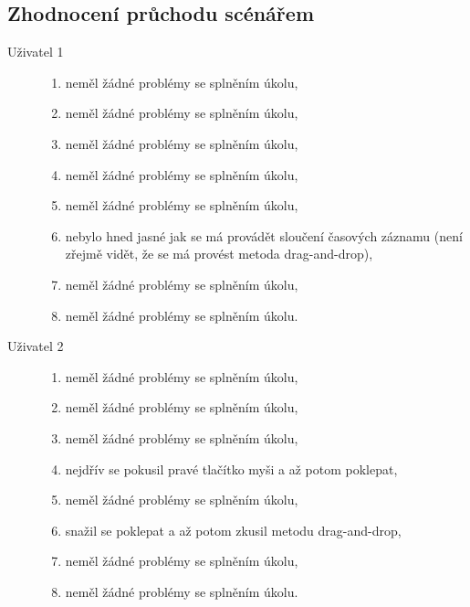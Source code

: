 \documentclass[thesis=B,czech]{FITthesis}[2012/06/26]
\begin{document}
\subsection{Zhodnocení průchodu scénářem}

\begin{description}
		\item[Uživatel 1] \hspace*{\fill} 
		\begin{enumerate}
			\item neměl žádné problémy se splněním úkolu,
			\item neměl žádné problémy se splněním úkolu,
			\item neměl žádné problémy se splněním úkolu,
			\item neměl žádné problémy se splněním úkolu,
			\item neměl žádné problémy se splněním úkolu,
			\item nebylo hned jasné jak se má provádět sloučení časových záznamu (není zřejmě vidět, že se má provést metoda drag-and-drop),
			\item neměl žádné problémy se splněním úkolu,
			\item neměl žádné problémy se splněním úkolu.
		\end{enumerate}
		
		\item[Uživatel 2]  \hspace*{\fill} 
				\begin{enumerate}
			\item neměl žádné problémy se splněním úkolu,
			\item neměl žádné problémy se splněním úkolu,
			\item neměl žádné problémy se splněním úkolu,
			\item nejdřív se pokusil pravé tlačítko myši a až potom poklepat,
			\item neměl žádné problémy se splněním úkolu,
			\item snažil se poklepat a až potom zkusil metodu drag-and-drop,
			\item neměl žádné problémy se splněním úkolu,
			\item neměl žádné problémy se splněním úkolu.
		\end{enumerate}
			

\end{description}
\end{document}
